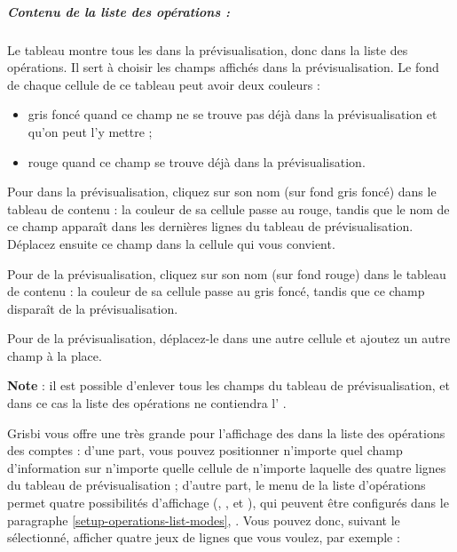 \subparagraph{Contenu de la liste des opérations :}

Le tableau montre tous les  dans la prévisualisation, donc dans la liste des opérations. Il sert à choisir les champs affichés dans la prévisualisation. Le fond de chaque cellule de ce tableau peut avoir deux couleurs :

\begin{itemize}
	\item gris foncé{\couleur} quand ce champ ne se trouve pas déjà dans la prévisualisation et qu'on peut l'y mettre ;
	\item rouge{\couleur} quand ce champ se trouve déjà dans la prévisualisation.
\end{itemize}

Pour  dans la prévisualisation, cliquez sur son nom (sur fond gris foncé{\couleur}) dans le tableau de contenu : la couleur de sa cellule passe au rouge{\couleur}, tandis que le nom de ce champ apparaît dans les dernières lignes du tableau de prévisualisation. Déplacez ensuite ce champ dans la cellule qui vous convient.

Pour  de la  prévisualisation, cliquez sur son nom (sur fond rouge{\couleur}) dans le tableau de contenu : la couleur de sa cellule passe au gris foncé{\couleur}, tandis que ce champ disparaît de la prévisualisation.

\ifIllustration
\fi


Pour  de la  prévisualisation, déplacez-le dans une autre cellule et ajoutez un autre champ à la place.

\textbf{Note} : il est possible d'enlever tous les champs du tableau de prévisualisation, et dans ce cas la liste des opérations ne contiendra l' .

Grisbi vous offre une très grande  pour l'affichage des  dans la liste des opérations des comptes : d'une part, vous pouvez positionner n'importe quel champ d'information sur n'importe quelle cellule de n'importe laquelle des quatre lignes du tableau de prévisualisation ; d'autre part, le menu  de la liste d'opérations permet quatre possibilités d'affichage (, ,  et ), qui peuvent être configurés dans le paragraphe \vref{setup-operations-list-modes}, . Vous pouvez donc, suivant le  sélectionné, afficher quatre jeux de lignes que vous voulez, par exemple :


